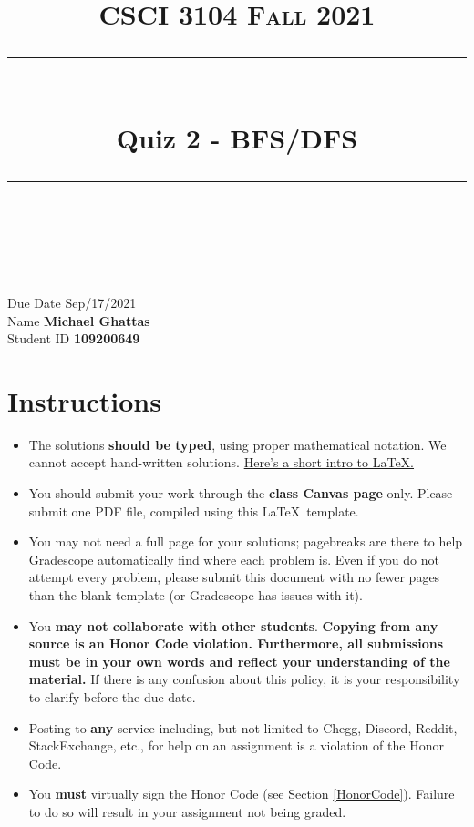\documentclass[11pt]{article}
\title{
\normalfont \normalsize 
\textsc{CSCI 3104 Fall 2021} \\
[10pt] 
\rule{\linewidth}{0.5pt} \\[6pt] 
\huge Quiz 2 - BFS/DFS \\
\rule{\linewidth}{2pt}  \\[10pt]
}
\date{}
\theoremstyle{definition}
\theoremstyle{definition}
\theoremstyle{definition}
\begin{document}
\maketitle


\noindent
Due Date \dotfill Sep/17/2021 \\
Name \dotfill \textbf{Michael Ghattas} \\
Student ID \dotfill \textbf{109200649} \\


\tableofcontents

\section{Instructions}
 \begin{itemize}
	\item The solutions \textbf{should be typed}, using proper mathematical notation. We cannot accept hand-written solutions. \href{http://ece.uprm.edu/~caceros/latex/introduction.pdf}{Here's a short intro to \LaTeX.}
	\item You should submit your work through the \textbf{class Canvas page} only. Please submit one PDF file, compiled using this \LaTeX \ template.
	\item You may not need a full page for your solutions; pagebreaks are there to help Gradescope automatically find where each problem is. Even if you do not attempt every problem, please submit this document with no fewer pages than the blank template (or Gradescope has issues with it).

	\item You \textbf{may not collaborate with other students}. \textbf{Copying from any source is an Honor Code violation. Furthermore, all submissions must be in your own words and reflect your understanding of the material.} If there is any confusion about this policy, it is your responsibility to clarify before the due date. 

	\item Posting to \textbf{any} service including, but not limited to Chegg, Discord, Reddit, StackExchange, etc., for help on an assignment is a violation of the Honor Code.

	\item You \textbf{must} virtually sign the Honor Code (see Section \ref{HonorCode}). Failure to do so will result in your assignment not being graded.
\end{itemize}
\end{document}
